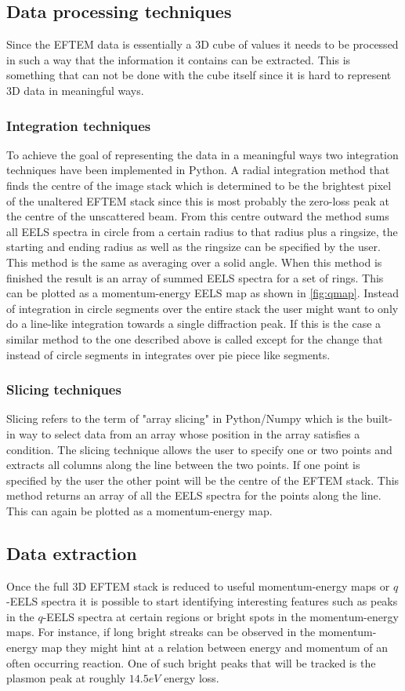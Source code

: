 \subsection{Data processing techniques}
Since the EFTEM data is essentially a 3D cube of values it needs to be processed in such a way that the information it contains can be extracted. This is something that can not be done with the cube itself since it is hard to represent 3D data in meaningful ways.

\subsubsection{Integration techniques}
To achieve the goal of representing the data in a meaningful ways two integration techniques have been implemented in Python.
A radial integration method that finds the centre of the image stack which is determined to be the brightest pixel of the unaltered EFTEM stack since this is most probably the zero-loss peak at the centre of the unscattered beam.
From this centre outward the method sums all EELS spectra in circle from a certain radius to that radius plus a ringsize, the starting and ending radius as well as the ringsize can be specified by the user.
This method is the same as averaging over a solid angle.
When this method is finished the result is an array of summed EELS spectra for a set of rings. This can be plotted as a momentum-energy EELS map as shown in \ref{fig:qmap}.
Instead of integration in circle segments over the entire stack the user might want to only do a line-like integration towards a single diffraction peak. If this is the case a similar method to the one described above is called except for the change that instead of circle segments in integrates over pie piece like segments.


\subsubsection{Slicing techniques}
Slicing refers to the term of "array slicing" in Python/Numpy\cite{Harris2020} which is the built-in way to select data from an array whose position in the array satisfies a condition. The slicing technique allows the user to specify one or two points and extracts all columns along the line between the two points. If one point is specified by the user the other point will be the centre of the EFTEM stack. This method returns an array of all the EELS spectra for the points along the line. This can again be plotted as a momentum-energy map.

\subsection{Data extraction}
Once the full 3D EFTEM stack is reduced to useful momentum-energy maps or $q$-EELS spectra it is possible to start identifying interesting features such as peaks in the $q$-EELS spectra at certain regions or bright spots in the momentum-energy maps. For instance, if long bright streaks can be observed in the momentum-energy map they might hint at a relation between energy and momentum of an often occurring reaction. One of such bright peaks that will be tracked is the plasmon peak at roughly $14.5eV$ energy loss.

